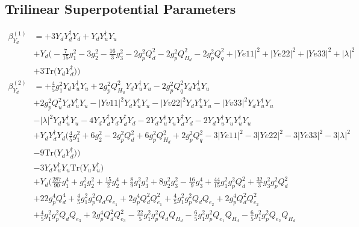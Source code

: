 \subsection{Trilinear Superpotential Parameters}
{\allowdisplaybreaks  \begin{align} 
\beta_{Y_d}^{(1)} & =  
+3 {Y_d  Y_{d}^{\dagger}  Y_d} +{Y_d  Y_{u}^{\dagger}  Y_u}\nonumber \\ 
 &+Y_d \Big(-\frac{7}{15} g_{1}^{2} -3 g_{2}^{2} -\frac{16}{3} g_{3}^{2} -2 g_{p}^{2} Q_{d}^{2} -2 g_{p}^{2} Q_{H_d}^{2} -2 g_{p}^{2} Q_{q}^{2} +|Ye11|^2+|Ye22|^2+|Ye33|^2+|\lambda|^2\nonumber \\ 
 &+3 \mbox{Tr}\Big({Y_d  Y_{d}^{\dagger}}\Big) \Big)\\ 
\beta_{Y_d}^{(2)} & =  
+\frac{4}{5} g_{1}^{2} {Y_d  Y_{u}^{\dagger}  Y_u} +2 g_{p}^{2} Q_{H_u}^{2} {Y_d  Y_{u}^{\dagger}  Y_u} -2 g_{p}^{2} Q_{q}^{2} {Y_d  Y_{u}^{\dagger}  Y_u} \nonumber \\ 
 &+2 g_{p}^{2} Q_{u}^{2} {Y_d  Y_{u}^{\dagger}  Y_u} - |Yv11|^2 {Y_d  Y_{u}^{\dagger}  Y_u} - |Yv22|^2 {Y_d  Y_{u}^{\dagger}  Y_u} - |Yv33|^2 {Y_d  Y_{u}^{\dagger}  Y_u} \nonumber \\ 
 &- |\lambda|^2 {Y_d  Y_{u}^{\dagger}  Y_u} -4 {Y_d  Y_{d}^{\dagger}  Y_d  Y_{d}^{\dagger}  Y_d} -2 {Y_d  Y_{u}^{\dagger}  Y_u  Y_{d}^{\dagger}  Y_d} -2 {Y_d  Y_{u}^{\dagger}  Y_u  Y_{u}^{\dagger}  Y_u} \nonumber \\ 
 &+{Y_d  Y_{d}^{\dagger}  Y_d} \Big(\frac{4}{5} g_{1}^{2} +6 g_{2}^{2} -2 g_{p}^{2} Q_{d}^{2} +6 g_{p}^{2} Q_{H_d}^{2} +2 g_{p}^{2} Q_{q}^{2} -3 |Ye11|^2 -3 |Ye22|^2 -3 |Ye33|^2 -3 |\lambda|^2 \nonumber \\ 
 &-9 \mbox{Tr}\Big({Y_d  Y_{d}^{\dagger}}\Big) \Big)\nonumber \\ 
 &-3 {Y_d  Y_{u}^{\dagger}  Y_u} \mbox{Tr}\Big({Y_u  Y_{u}^{\dagger}}\Big) \nonumber \\ 
 &+Y_d \Big(\frac{287}{90} g_{1}^{4} +g_{1}^{2} g_{2}^{2} +\frac{15}{2} g_{2}^{4} +\frac{8}{9} g_{1}^{2} g_{3}^{2} +8 g_{2}^{2} g_{3}^{2} -\frac{16}{9} g_{3}^{4} +\frac{44}{15} g_{1}^{2} g_{p}^{2} Q_{d}^{2} +\frac{32}{3} g_{3}^{2} g_{p}^{2} Q_{d}^{2} \nonumber \\ 
 &+22 g_{p}^{4} Q_{d}^{4} +\frac{4}{5} g_{1}^{2} g_{p}^{2} Q_{d} Q_{e_{1}} +2 g_{p}^{4} Q_{d}^{2} Q_{e_{1}}^{2} +\frac{4}{5} g_{1}^{2} g_{p}^{2} Q_{d} Q_{e_{2}} +2 g_{p}^{4} Q_{d}^{2} Q_{e_{2}}^{2} \nonumber \\ 
 &+\frac{4}{5} g_{1}^{2} g_{p}^{2} Q_{d} Q_{e_3} +2 g_{p}^{4} Q_{d}^{2} Q_{e_3}^{2} -\frac{22}{5} g_{1}^{2} g_{p}^{2} Q_{d} Q_{H_d} -\frac{6}{5} g_{1}^{2} g_{p}^{2} Q_{e_{1}} Q_{H_d} -\frac{6}{5} g_{1}^{2} g_{p}^{2} Q_{e_{2}} Q_{H_d} \nonumber \\ 

\end{align}}
